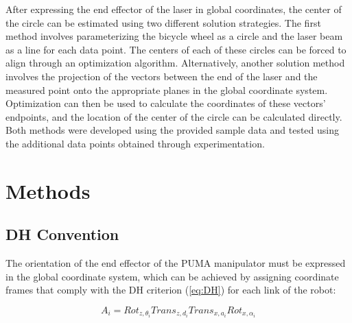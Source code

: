 \documentclass[12pt]{article}
\begin{document}
After expressing the end effector of the laser in global coordinates, the center of the circle can be estimated using two different solution strategies.  The first method involves parameterizing the bicycle wheel as a circle and the laser beam as a line for each data point.  The centers of each of these circles can be forced to align through an optimization algorithm.  Alternatively, another solution method involves the projection of the vectors between the end of the laser and the measured point onto the appropriate planes in the global coordinate system. Optimization can then be used to calculate the coordinates of these vectors' endpoints, and the location of the center of the circle can be calculated directly. Both methods were developed using the provided sample data and tested using the additional data points obtained through experimentation.  

\printnomenclature

\section{Methods}

\subsection{DH Convention} \label{sec:DHConvention}

The orientation of the end effector of the PUMA manipulator must be expressed in the global coordinate system, which can be achieved by assigning coordinate frames that comply with the DH criterion (\ref{eq:DH}) for each link of the robot:

\begin{equation}
	A_{i} = Rot_{z,\theta_{i}}Trans_{z,d_{i}}
    	Trans_{x,a_{i}}Rot_{x,\alpha_{i}}
        \label{eq:DH}
 \end{equation}
 \noindent
\end{document}
